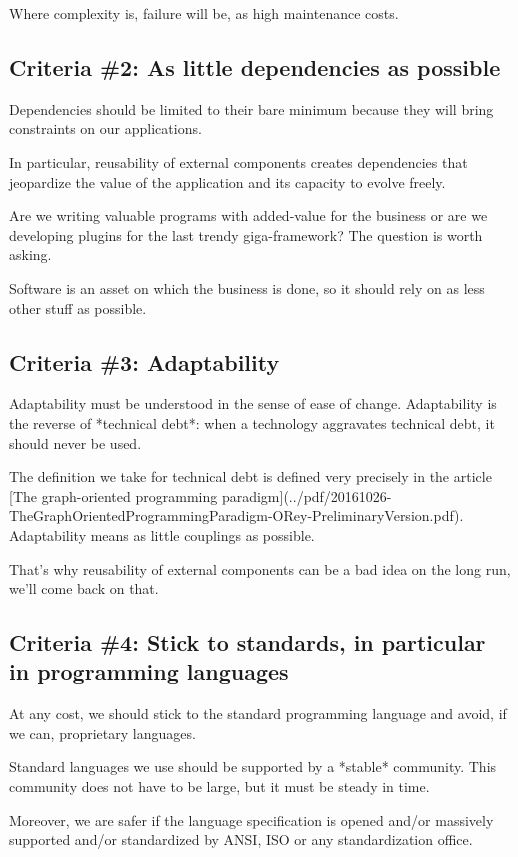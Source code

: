 \documentclass[]{article}
\begin{document}
Where complexity is, failure will be, as high maintenance costs.

\subsection{Criteria \#2: As little dependencies as possible}

Dependencies should be limited to their bare minimum because they will bring constraints on our applications.

In particular, reusability of external components creates dependencies that jeopardize the value of the application and its capacity to evolve freely.

Are we writing valuable programs with added-value for the business or are we developing plugins for the last trendy giga-framework? The question is worth asking.

Software is an asset on which the business is done, so it should rely on as less other stuff as possible.

\subsection{Criteria \#3: Adaptability}

Adaptability must be understood in the sense of ease of change. Adaptability is the reverse of *technical debt*: when a technology aggravates technical debt, it should never be used.

The definition we take for technical debt is defined very precisely in the article [The graph-oriented programming paradigm](../pdf/20161026-TheGraphOrientedProgrammingParadigm-ORey-PreliminaryVersion.pdf). Adaptability means as little couplings as possible.

That's why reusability of external components can be a bad idea on the long run, we'll come back on that.

\subsection{Criteria \#4: Stick to standards, in particular in programming languages}

At any cost, we should stick to the standard programming language and avoid, if we can, proprietary languages.

Standard languages we use should be supported by a *stable* community. This community does not have to be large, but it must be steady in time.

Moreover, we are safer if the language specification is opened and/or massively supported and/or standardized by ANSI, ISO or any standardization office.
\end{document}
